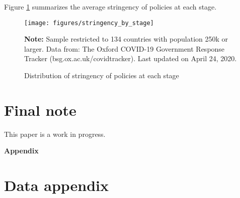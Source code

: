 \documentclass[12pt,english]{article}
\begin{document}
Figure \ref{fig:stringency} summarizes the average stringency of policies at each stage.

\begin{figure}[H]
	\singlespacing
	\centering
	 \caption{Distribution of stringency of policies at each stage}  \label{fig:stringency}
	\resizebox{0.7\width}{!} {
		\begin{threeparttable}

 			  \texttt{[image: figures/stringency\_by\_stage]}
  			 \begin{tablenotes}[flushleft]\vspace*{-7bp}
			\item \textbf{Note:} Sample restricted to 134 countries with population 250k or larger. Data from: The Oxford COVID-19 Government Response Tracker (bsg.ox.ac.uk/covidtracker). Last updated on April 24, 2020.
			 \end{tablenotes}
  		\end{threeparttable}
 		}
  	 \onehalfspacing
\end{figure}




\section{Final note\label{sec:Conclusion}}

This paper is a work in progress.

\pagebreak{}

\setlength\bibsep{0.65pt}
\setlength{\parskip}{0.1em}





\pagebreak{}



\appendix
\vphantom{}
\begin{center}
\textbf{\LARGE{}Appendix}
\par\end{center}{\LARGE \par}

\setcounter{figure}{0} \renewcommand{\thefigure}{A.\arabic{figure}}
\setcounter{table}{0} \renewcommand{\thetable}{A.\arabic{table}}


\section{Data appendix\label{sec:DataAppendix}}
\end{document}
